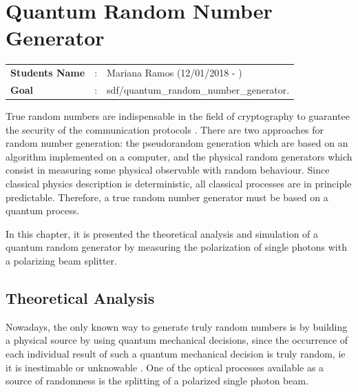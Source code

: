 \clearpage
\section{Quantum Random Number Generator}

\begin{tcolorbox}	
\begin{tabular}{p{2.75cm} p{0.2cm} p{10.5cm}} 	
\textbf{Students Name}  &:& Mariana Ramos (12/01/2018 - )\\
\textbf{Goal}          &:& sdf/quantum\_random\_number\_generator.
\end{tabular}
\end{tcolorbox}

True random numbers are indispensable in the field of cryptography to guarantee the security of the communication protocols \cite{katsoprinakis2008quantum}. There are two approaches for random number generation: the pseudorandom generation which are based on an algorithm implemented on a computer, and the physical random generators which consist in measuring some physical observable with random behaviour. Since classical physics description is deterministic, all classical processes are in principle predictable. Therefore, a true random number generator must be based on a quantum process.

In this chapter, it is presented the theoretical analysis and simulation of a quantum random generator by measuring the polarization of single photons with a polarizing beam splitter.

\subsection{Theoretical Analysis}

Nowadays, the only known way to generate truly random numbers is by building a physical source by using quantum mechanical decisions, since the occurrence of each individual result of such a quantum mechanical decision is truly random, ie it is inestimable or unknowable \cite{Zeilinger}. One of the optical processes available as a source of randomness is the splitting of a polarized single photon beam.

